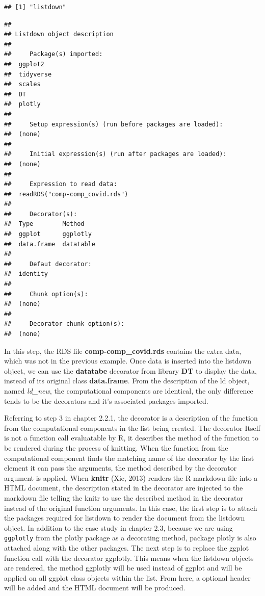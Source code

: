 \documentclass[
]{article}
\begin{document}
\begin{verbatim}
## [1] "listdown"
\end{verbatim}

\begin{verbatim}
## 
## Listdown object description
## 
##     Package(s) imported:
##  ggplot2
##  tidyverse
##  scales
##  DT
##  plotly
## 
##     Setup expression(s) (run before packages are loaded):
##  (none)
## 
##     Initial expression(s) (run after packages are loaded):
##  (none)
## 
##     Expression to read data:
##  readRDS("comp-comp_covid.rds")
## 
##     Decorator(s):
##  Type        Method
##  ggplot      ggplotly
##  data.frame  datatable
## 
##     Defaut decorator:
##  identity
## 
##     Chunk option(s):
##  (none)
## 
##     Decorator chunk option(s):
##  (none)
\end{verbatim}

In this step, the RDS file \textbf{comp-comp\_covid.rds} contains the
extra data, which was not in the previous example. Once data is inserted
into the listdown object, we can use the \textbf{datatabe} decorator
from library \textbf{DT} to display the data, instead of its original
class \textbf{data.frame}. From the description of the ld object, named
\emph{ld\_new}, the computational components are identical, the only
difference tends to be the decorators and it's associated packages
imported.

Referring to step 3 in chapter 2.2.1, the decorator is a description of
the function from the computational components in the list being
created. The decorator Itself is not a function call evaluatable by R,
it describes the method of the function to be rendered during the
process of knitting. When the function from the computational component
finds the matching name of the decorator by the first element it can
pass the arguments, the method described by the decorator argument is
applied. When \textbf{knitr} (Xie, 2013) renders the R markdown file
into a HTML document, the description stated in the decorator are
injected to the markdown file telling the knitr to use the described
method in the decorator instead of the original function arguments. In
this case, the first step is to attach the packages required for
listdown to render the document from the listdown object. In addition to
the case study in chapter 2.3, because we are using \texttt{ggplotly}
from the plotly package as a decorating method, package plotly is also
attached along with the other packages. The next step is to replace the
ggplot function call with the decorator ggplotly. This means when the
listdown objects are rendered, the method ggplotly will be used instead
of ggplot and will be applied on all ggplot class objects within the
list. From here, a optional header will be added and the HTML document
will be produced.
\end{document}
